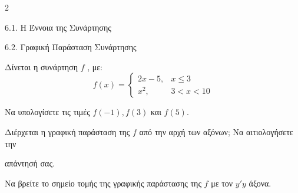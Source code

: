 \begin{ylh}{2}
    \item 6.1. Η Έννοια της Συνάρτησης
    \item 6.2. Γραφική Παράσταση Συνάρτησης
\end{ylh}
Δίνεται η συνάρτηση $f$ , με: $$f(x) = \begin{cases} 2x - 5, & x \le 3 \\ x^2, & 3 < x < 10 \end{cases}$$
\begin{alist}
\item Να υπολογίσετε τις τιμές $f(-1), f(3)$ και $f(5)$. 
\item Διέρχεται η γραφική παράσταση της $f$ από την αρχή των αξόνων; Να αιτιολογήσετε την

 απάντησή σας. 
\item Να βρείτε το σημείο τομής της γραφικής παράστασης της $f$ με τον $y'y$ άξονα. 
\end{alist}

